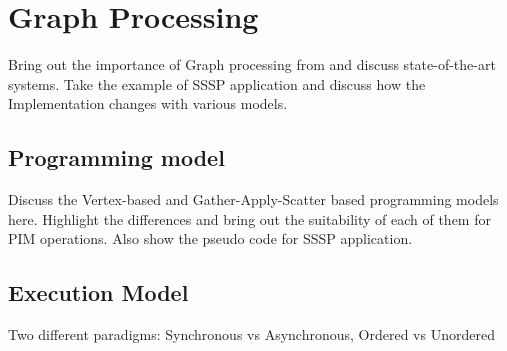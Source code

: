 
\section{Graph Processing}

Bring out the importance of Graph processing from \cite{BrainGraph,RoadGraph, SocialGraph} and discuss state-of-the-art systems. Take the example of SSSP application and discuss how the Implementation changes with various models.


  \subsection{Programming model}
    Discuss the Vertex-based \cite{Pregel} and Gather-Apply-Scatter\cite{PowerGraph} based programming models here. Highlight the differences and bring out the suitability of each of them for PIM operations. Also show the pseudo code for SSSP application.

  \subsection{Execution Model}
    Two different paradigms: Synchronous vs Asynchronous\cite{Tesseract}, Ordered vs Unordered\cite{OvsUO}
